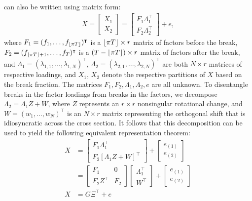 \documentclass[12pt]{article}
\newcommand*{\tran}{\intercal}
\theoremstyle{plain}
\numberwithin{equation}{section}
\begin{document}
 can also be written using matrix form:
\begin{align}
\label{eqn:matrix_form}
X = 
\begin{bmatrix}
X_1 \\
X_2
\end{bmatrix} 
= \begin{bmatrix}
F_{1} \Lambda_1^\tran \\
F_{2} \Lambda_2^\tran 
\end{bmatrix} +
e,
\end{align}
where $F_{1} = (f_{1}, \dots, f_{\floor{\pi T}})^\tran$ is a $\left \lfloor \pi T \right \rfloor \times r$ matrix of factors before the break, $F_{2} = (f_{\floor{\pi T} + 1}, \dots, f_{T})^\tran$ is a $(T - \left \lfloor \pi T \right \rfloor) \times r$ matrix of factors after the break, and $\Lambda_1 = (\lambda_{1, 1}, \dots, \lambda_{1, N})^\tran$, $\Lambda_2 = (\lambda_{2, 1}, \dots, \lambda_{2, N})^\tran$ are both $N \times r$ matrices of respective loadings, and $X_1$, $X_2$ denote the respective partitions of $X$ based on the break fraction. The matrices $F_1, F_2, \Lambda_1, \Lambda_2, e$ are all unknown. 
To disentangle breaks in the factor loadings from breaks in the factors, we decompose $\Lambda_2 = \Lambda_1 Z + W$, where $Z$ represents an $r \times r$ nonsingular rotational change, and $W = (w_1, \dots, w_N)^\tran$ is an $N \times r$ matrix representing the orthogonal shift that is idiosyncratic across the cross section. It follows that this decomposition can be used to yield the following equivalent representation theorem: 
\begin{align}
\label{eqn:projection_ert:1}
X &= 
\begin{bmatrix}
F_1 \Lambda_1^\tran \\
F_2 [\Lambda_1 Z + W]^\tran 
\end{bmatrix} + 
\begin{bmatrix}
e_{(1)} \\
e_{(2)}
\end{bmatrix} \\
&= \begin{bmatrix}
F_1 & 0 \nonumber \\
F_2 Z^\tran & F_2 
\end{bmatrix}
\begin{bmatrix}
\Lambda_1^\tran \\
W^\tran
\end{bmatrix} +
\begin{bmatrix}
e_{(1)} \\
e_{(2)}
\end{bmatrix} \nonumber \\
\label{eqn:projection_ert}
X &= G \Xi^\tran + e
\end{align}
\end{document}
